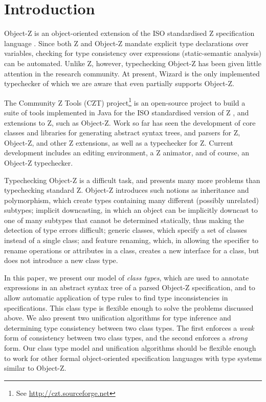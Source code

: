 \section{Introduction}

Object-Z \cite{smith00} is an object-oriented extension of the ISO
standardised Z specification language \cite{isoz}. Since both Z
and Object-Z mandate explicit type declarations over variables,
checking for type consistency over expressions (static-semantic
analysis) can be automated. Unlike Z, however, typechecking Object-Z
has been given little attention in the research community.  At
present, Wizard \cite{johnston96} is the only implemented typechecker
of which we are aware that even partially supports Object-Z.

The Community Z Tools (CZT) project\footnote{See
\url{http://czt.sourceforge.net}} is an open-source project to build a
suite of tools implemented in Java for the ISO standardised version of
Z \cite{isoz}, and extensions to Z, such as Object-Z. Work so far has
seen the development of core classes and libraries for generating
abstract syntax trees, and parsers for Z, Object-Z, and other Z
extensions, as well as a typechecker for Z. Current development
includes an editing environment, a Z animator, and of course, an
Object-Z typechecker.

Typechecking Object-Z is a difficult task, and presents many more
problems than typechecking standard Z. Object-Z introduces such
notions as inheritance and polymorphism, which create types containing
many different (possibly unrelated) subtypes; implicit downcasting, in
which an object can be implicitly downcast to one of many subtypes
that cannot be determined statically, thus making the detection of
type errors difficult; generic classes, which specify a set of classes
instead of a single class; and feature renaming, which, in allowing
the specifier to rename operations or attributes in a class, creates a
new interface for a class, but does not introduce a new class type.

In this paper, we present our model of {\em class types}, which are
used to annotate expressions in an abstract syntax tree of a parsed
Object-Z specification, and to allow automatic application of type
rules to find type inconsistencies in specifications. This class type
is flexible enough to solve the problems discussed above. We also
present two unification algorithms for type inference and determining
type consistency between two class types. The first enforces a {\em
weak} form of consistency between two class types, and the second
enforces a {\em strong} form. Our class type model and unification
algorithms should be flexible enough to work for other formal
object-oriented specification languages with type systems similar to
Object-Z.
